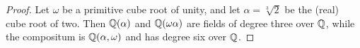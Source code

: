 \begin{proof} 
    Let $\omega$ be a primitive cube root of unity, and let $\alpha = \sqrt[3]{2}$ be the (real) cube root of two. Then $\mathbb{Q}(\alpha)$ and $\mathbb{Q}(\omega\alpha)$ are fields of degree three over $\mathbb{Q}$, while the compositum is $\mathbb{Q}(\alpha, \omega)$ and has degree six over $\mathbb{Q}$.
\end{proof}
